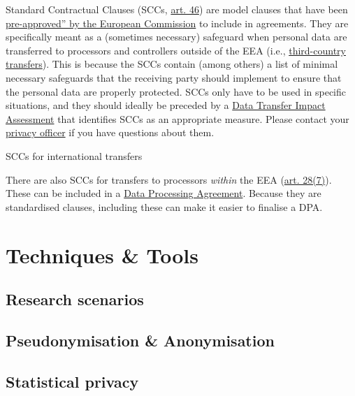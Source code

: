 \documentclass[
]{book}
\begin{document}
Standard Contractual Clauses (SCCs,
\href{https://gdpr-info.eu/art-46-gdpr/}{art. 46}) are
model clauses that have been
\href{https://ec.europa.eu/info/law/law-topic/data-protection/international-dimension-data-protection/standard-contractual-clauses-scc_en}{pre-approved'' by the European Commission}
to include in agreements. They are specifically meant as a (sometimes necessary)
safeguard when personal data are transferred to processors and controllers
outside of the EEA (i.e., \protect\hyperlink{third-country-transfer}{third-country transfers}).
This is because the SCCs contain (among others) a list of
minimal necessary safeguards that the receiving party should implement to ensure
that the personal data are properly protected. SCCs only have to be used in
specific situations, and they should ideally be preceded by a
\protect\hyperlink{dia}{Data Transfer Impact Assessment} that identifies SCCs as an
appropriate measure. Please contact your \protect\hyperlink{support}{privacy officer}
if you have questions about them.

SCCs for international transfers

There are also SCCs for transfers to processors \emph{within} the EEA
(\href{https://gdpr-info.eu/art-28-gdpr/}{art. 28(7)}).
These can be included in a
\protect\hyperlink{data-processing-agreement}{Data Processing Agreement}. Because they
are standardised clauses, including these can make it easier to finalise a DPA.

\hypertarget{part-techniques-tools}{%
\part*{Techniques \& Tools}\label{part-techniques-tools}}

\hypertarget{research-scenarios}{%
\chapter{Research scenarios}\label{research-scenarios}}

\hypertarget{pseudonymisation-anonymisation}{%
\chapter{Pseudonymisation \& Anonymisation}\label{pseudonymisation-anonymisation}}

\hypertarget{statistical-privacy}{%
\chapter{Statistical privacy}\label{statistical-privacy}}
\end{document}

